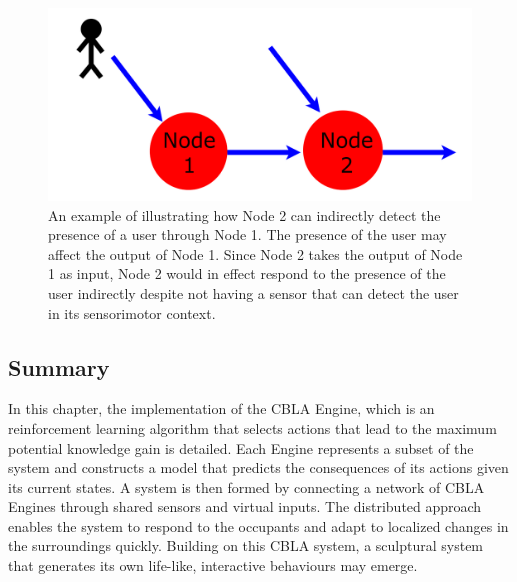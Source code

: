 \begin{figure}[!htb]
	\centering
	\includegraphics[height=0.20 \textheight]{"fig/cbla/Indirect input diagram"}
	\caption[Illustration explaining how virtual inputs may be used to detect changes outside of a node's sensorimotor context]{An example of illustrating how Node 2 can indirectly detect the presence of a user through Node 1. The presence of the user may affect the output of Node 1. Since Node 2 takes the output of Node 1 as input, Node 2 would in effect respond to the presence of the user indirectly despite not having a sensor that can detect the user in its sensorimotor context.}
	\label{fig:Indirect input diagram}
\end{figure}

\subsection{Summary}

In this chapter, the implementation of the CBLA Engine, which is an reinforcement learning algorithm that selects actions that lead to the maximum potential knowledge gain is detailed. Each Engine represents a subset of the system and constructs a model that predicts the consequences of its actions given its current states. A system is then formed by connecting a network of CBLA Engines through shared sensors and virtual inputs. The distributed approach enables the system to respond to the occupants and adapt to localized changes in the surroundings quickly. Building on this CBLA system, a sculptural system that generates its own life-like, interactive behaviours may emerge.

\FloatBarrier  

